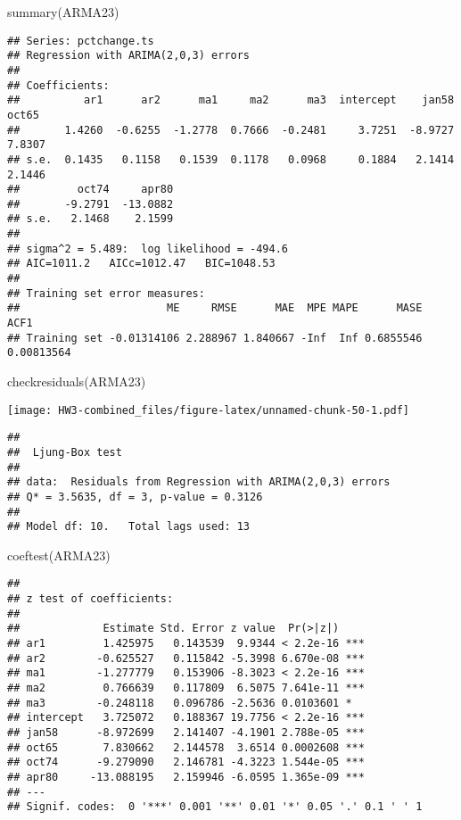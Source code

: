 \documentclass[
]{article}
\newenvironment{Shaded}{\begin{snugshade}}{\end{snugshade}}
\newcommand{\FunctionTok}[1]{\textcolor[rgb]{0.00,0.00,0.00}{#1}}
\newcommand{\NormalTok}[1]{#1}
\begin{document}
\begin{Shaded}
\begin{Highlighting}[]
\FunctionTok{summary}\NormalTok{(ARMA23)}
\end{Highlighting}
\end{Shaded}

\begin{verbatim}
## Series: pctchange.ts 
## Regression with ARIMA(2,0,3) errors 
## 
## Coefficients:
##          ar1      ar2      ma1     ma2      ma3  intercept    jan58   oct65
##       1.4260  -0.6255  -1.2778  0.7666  -0.2481     3.7251  -8.9727  7.8307
## s.e.  0.1435   0.1158   0.1539  0.1178   0.0968     0.1884   2.1414  2.1446
##         oct74     apr80
##       -9.2791  -13.0882
## s.e.   2.1468    2.1599
## 
## sigma^2 = 5.489:  log likelihood = -494.6
## AIC=1011.2   AICc=1012.47   BIC=1048.53
## 
## Training set error measures:
##                       ME     RMSE      MAE  MPE MAPE      MASE       ACF1
## Training set -0.01314106 2.288967 1.840667 -Inf  Inf 0.6855546 0.00813564
\end{verbatim}

\begin{Shaded}
\begin{Highlighting}[]
\FunctionTok{checkresiduals}\NormalTok{(ARMA23)}
\end{Highlighting}
\end{Shaded}

\texttt{[image: HW3-combined\_files/figure-latex/unnamed-chunk-50-1.pdf]}

\begin{verbatim}
## 
##  Ljung-Box test
## 
## data:  Residuals from Regression with ARIMA(2,0,3) errors
## Q* = 3.5635, df = 3, p-value = 0.3126
## 
## Model df: 10.   Total lags used: 13
\end{verbatim}

\begin{Shaded}
\begin{Highlighting}[]
\FunctionTok{coeftest}\NormalTok{(ARMA23)}
\end{Highlighting}
\end{Shaded}

\begin{verbatim}
## 
## z test of coefficients:
## 
##             Estimate Std. Error z value  Pr(>|z|)    
## ar1         1.425975   0.143539  9.9344 < 2.2e-16 ***
## ar2        -0.625527   0.115842 -5.3998 6.670e-08 ***
## ma1        -1.277779   0.153906 -8.3023 < 2.2e-16 ***
## ma2         0.766639   0.117809  6.5075 7.641e-11 ***
## ma3        -0.248118   0.096786 -2.5636 0.0103601 *  
## intercept   3.725072   0.188367 19.7756 < 2.2e-16 ***
## jan58      -8.972699   2.141407 -4.1901 2.788e-05 ***
## oct65       7.830662   2.144578  3.6514 0.0002608 ***
## oct74      -9.279090   2.146781 -4.3223 1.544e-05 ***
## apr80     -13.088195   2.159946 -6.0595 1.365e-09 ***
## ---
## Signif. codes:  0 '***' 0.001 '**' 0.01 '*' 0.05 '.' 0.1 ' ' 1
\end{verbatim}
\end{document}
